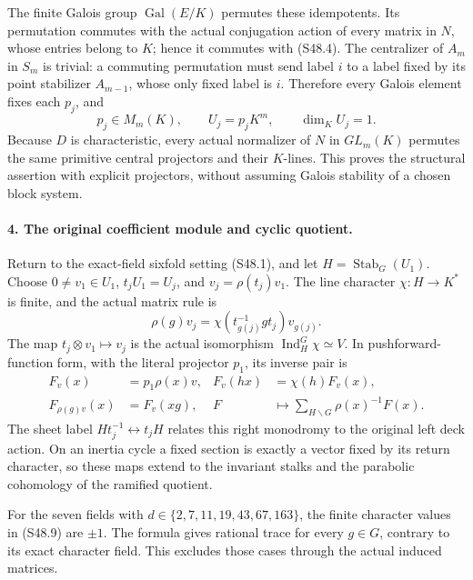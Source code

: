 The finite Galois group \(\operatorname{Gal}(E/K)\)
permutes these idempotents. Its permutation commutes with the
actual conjugation action of every matrix in \(N\), whose
entries belong to \(K\); hence it commutes with (S48.4).
The centralizer of \(A_m\) in \(S_m\) is trivial:
a commuting permutation must send label \(i\) to a label
fixed by its point stabilizer \(A_{m-1}\), whose only
fixed label is \(i\). Therefore every Galois element fixes
each \(p_j\), and
\[
                p_j\in M_m(K),\qquad
                U_j=p_jK^m,\qquad\dim_KU_j=1.
 \tag{S48.8}
\]
Because \(D\) is characteristic, every actual normalizer
of \(N\) in \(GL_m(K)\) permutes the same primitive
central projectors and their \(K\)-lines. This proves the
structural assertion with explicit projectors, without
assuming Galois stability of a chosen block system.

\paragraph{4. The original coefficient module and cyclic quotient.}
Return to the exact-field sixfold setting (S48.1), and let
\(H=\operatorname{Stab}_G(U_1)\). Choose
\(0\ne v_1\in U_1\), \(t_jU_1=U_j\), and
\(v_j=\rho(t_j)v_1\). The line character
\(\chi:H\to K^*\) is finite, and the actual matrix rule is
\[
 \rho(g)v_j=
       \chi(t_{g(j)}^{-1}gt_j)v_{g(j)}.
 \tag{S48.9}
\]
The map \(t_j\otimes v_1\mapsto v_j\) is the actual
isomorphism \(\operatorname{Ind}_H^G\chi\simeq V\).
In pushforward-function form, with the literal projector
\(p_1\), its inverse pair is
\[
 \begin{aligned}
 F_v(x)&=p_1\rho(x)v,&F_v(hx)&=\chi(h)F_v(x),\\
 F_{\rho(g)v}(x)&=F_v(xg),&
 F&\longmapsto\sum_{H\backslash G}\rho(x)^{-1}F(x).
 \end{aligned}
 \tag{S48.10}
\]
The sheet label \(Ht_j^{-1}\leftrightarrow t_jH\)
relates this right monodromy to the original left deck action.
On an inertia cycle a fixed section is exactly a vector fixed
by its return character, so these maps extend to the invariant
stalks and the parabolic cohomology of the ramified quotient.

For the seven fields with \(d\in\{2,7,11,19,43,67,163\}\),
the finite character values in (S48.9) are \(\pm1\).
The formula gives rational trace for every \(g\in G\),
contrary to its exact character field. This excludes those
cases through the actual induced matrices.

